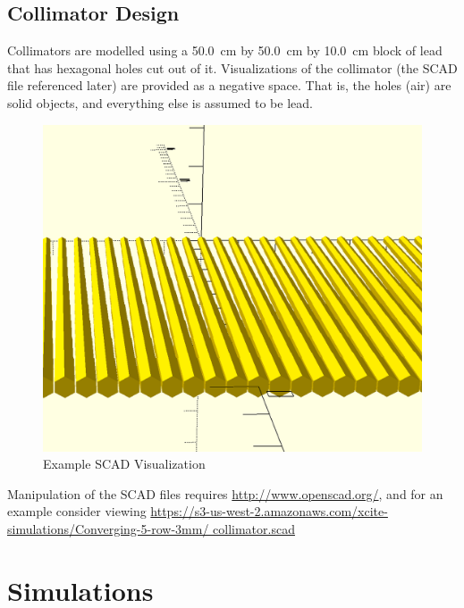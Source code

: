 \documentclass[12pt]{article}
\begin{document}
\subsection*{Collimator Design}
Collimators are modelled using a \SI{50.0}{\cm} by \SI{50.0}{\cm} by \SI{10.0}{\cm} block of lead that has hexagonal holes cut out of it. Visualizations of the collimator (the SCAD file referenced later) are provided as a negative space. That is, the holes (air) are solid objects, and everything else is assumed to be lead.

\begin{figure}[H]
\centering
\includegraphics[scale=0.3]{../collimator.png}
\caption{Example SCAD Visualization}
\end{figure}

Manipulation of the SCAD files requires \url{http://www.openscad.org/}, and for an example consider viewing \url{https://s3-us-west-2.amazonaws.com/xcite-simulations/Converging-5-row-3mm/ collimator.scad}

\section*{Simulations}
\end{document}
